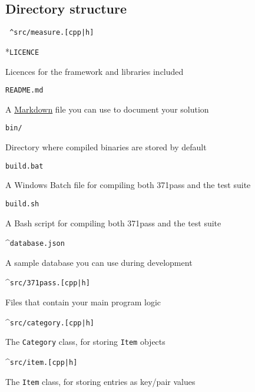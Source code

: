 \documentclass[a4paper]{article}
\begin{document}
\subsection*{Directory structure}\label{sec:cwk dir}




\begin{labeling}{\texttt{{\color{blue} \^{}}src/measure.[cpp|h] }}
    \item[{\color{red} *}\texttt{LICENCE}]

    Licences for the framework and libraries included

    \item[\texttt{README.md}]

    A \href{https://commonmark.org}{Markdown} file you can use to document your solution

    \item[\texttt{bin/}]

    Directory where compiled binaries are stored by default

    \item[\texttt{build.bat}]

    A Windows Batch file for compiling both 371pass and the test suite

    \item[\texttt{build.sh}]

    A Bash script for compiling both 371pass and the test suite

    \item[{\color{blue} \^{}}\texttt{database.json}]

    A sample database you can use during development

    \item[{\color{blue} \^{}}\texttt{src/371pass.[cpp|h]}]

    Files that contain your main program logic

    \item[{\color{blue} \^{}}\texttt{src/category.[cpp|h]}]

    The \texttt{Category} class, for storing \texttt{Item} objects
    
    \item[{\color{blue} \^{}}\texttt{src/item.[cpp|h]}]

    The \texttt{Item} class, for storing entries as key/pair values


\end{labeling}
\end{document}
